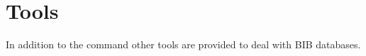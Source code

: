 
\chapter{Tools}

In addition to the command  other tools are provided to
deal with BIB databases.




\endinput
%
